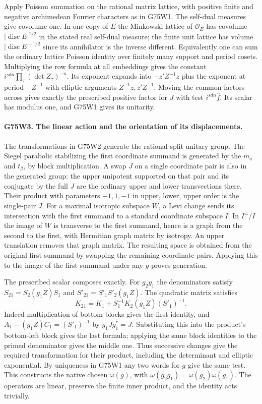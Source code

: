 Apply Poisson summation on the rational matrix lattice, with positive
finite and negative archimedean Fourier characters as in G75W1.
The self-dual measures give covolume one. In one copy of $E$ the
Minkowski lattice of $\mathcal O_E$ has covolume
$|\operatorname{disc}E|^{1/2}$ in the stated real self-dual measure;
the finite unit lattice has volume $|\operatorname{disc}E|^{-1/2}$
since its annihilator is the inverse different. Equivalently one
can sum the ordinary lattice Poisson identity over finitely many
support and period cosets. Multiplying the row formula at all
embeddings gives the constant $i^{sdn}\prod_\tau(\det Z_\tau)^{-n}$.
Its exponent expands into $-z'Z^{-1}z$ plus the exponent at period
$-Z^{-1}$ with elliptic arguments $Z^{-1}z,z'Z^{-1}$.
Moving the common factors across gives exactly the prescribed positive
factor for $J$ with test $i^{sdn}\widehat f$. Its scalar has modulus
one, and G75W1 gives its unitarity.

\paragraph{G75W3. The linear action and the orientation of its displacements.}
The transformations in G75W2 generate the rational split unitary
group. The Siegel parabolic stabilizing the first coordinate summand
is generated by the $m_a$ and $t_\beta$, by block multiplication.
A swap $J$ on a single coordinate pair is also in the generated group:
the upper unipotent supported on that pair and its conjugate by the
full $J$ are the ordinary upper and lower transvections there.
Their product with parameters $-1,1,-1$ in upper, lower, upper
order is the single-pair $J$. For a maximal isotropic subspace $W$,
a Levi change sends its intersection with the first summand to a
standard coordinate subspace $I$. In $I^\perp/I$ the image of $W$
is transverse to the first summand, hence is a graph from the
second to the first, with Hermitian graph matrix by isotropy. An
upper translation removes that graph matrix. The resulting space is
obtained from the original first summand by swapping the remaining
coordinate pairs. Applying this to the image of the first summand
under any $g$ proves generation.

The prescribed scalar composes exactly. For $g_2g_1$ the denominators
satisfy $S_{21}=S_2(g_1 Z)S_1$ and $S'_{21}=S'_1 S'_2(g_1 Z)$.
The quadratic matrix satisfies
\[
 K_{21}=K_1+S_1^{-1}K_2(g_1Z)(S'_1)^{-1}.
\]
Indeed multiplication of bottom blocks gives the first identity,
and $A_1-(g_1 Z)C_1=(S'_1)^{-1}$ by $g_1Jg_1^*=J$.
Substituting this into the product's bottom-left block gives the
last formula; applying the same block identities to the primed
denominator gives the middle one. Thus successive changes give the
required transformation for their product, including the determinant
and elliptic exponential. By uniqueness in G75W1 any two words for
$g$ give the same test. This constructs the native chosen
$\omega(g)$, with $\omega(g_2g_1)=\omega(g_2)\omega(g_1)$.
The operators are linear, preserve the finite inner product, and
the identity acts trivially.

